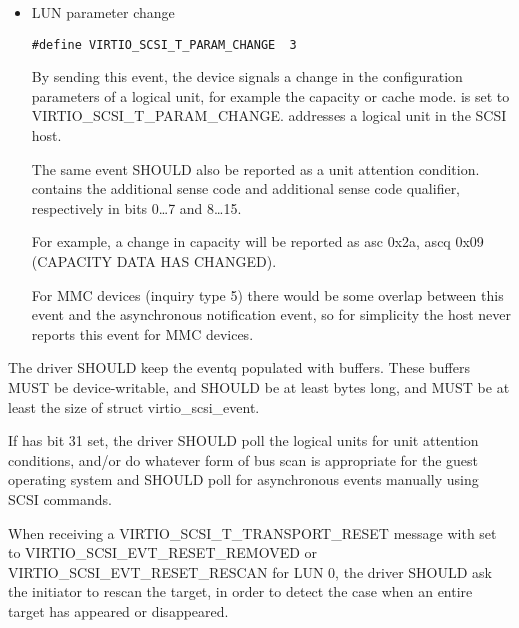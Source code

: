 \begin{itemize}
  \item LUN parameter change
\begin{lstlisting}
#define VIRTIO_SCSI_T_PARAM_CHANGE  3
\end{lstlisting}

  By sending this event, the device signals a change in the configuration parameters
  of a logical unit, for example the capacity or cache mode.
   is set to VIRTIO_SCSI_T_PARAM_CHANGE.
   addresses a logical unit in the SCSI host.

  The same event SHOULD also be reported as a unit attention condition.
   contains the additional sense code and additional sense code qualifier,
  respectively in bits 0\ldots 7 and 8\ldots 15.
  \begin{note}
  For example, a change in capacity will be reported as asc 0x2a, ascq 0x09
  (CAPACITY DATA HAS CHANGED).
  \end{note}

  For MMC devices (inquiry type 5) there would be some overlap between this
  event and the asynchronous notification event, so for simplicity the host never
  reports this event for MMC devices.
\end{itemize}


The driver SHOULD keep the eventq populated with buffers.  These
buffers MUST be device-writable, and SHOULD be at least
 bytes long, and MUST be at least the size of
struct virtio_scsi_event.

If  has bit 31 set, the driver SHOULD
poll the logical units for unit attention conditions, and/or do
whatever form of bus scan is appropriate for the guest operating
system and SHOULD poll for asynchronous events manually using SCSI commands.

When receiving a VIRTIO_SCSI_T_TRANSPORT_RESET message with
 set to VIRTIO_SCSI_EVT_RESET_REMOVED or
VIRTIO_SCSI_EVT_RESET_RESCAN for LUN 0, the driver SHOULD ask the
initiator to rescan the target, in order to detect the case when an
entire target has appeared or disappeared.


